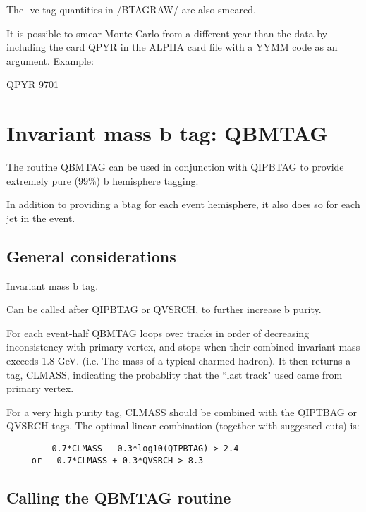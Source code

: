            The -ve tag quantities in /BTAGRAW/ are also smeared.

It is possible to smear Monte Carlo from a different year than the
data by including the card    QPYR in the ALPHA card file with a YYMM  
code as an argument.  Example:

QPYR 9701




\par
\section{\label{sec-BMTAG}Invariant mass b tag: QBMTAG}


       The routine QBMTAG can be used in conjunction with QIPBTAG
       to provide extremely pure (99\%) b hemisphere tagging.

      In addition to providing  a btag for each event
       hemisphere, it  also does so for each jet in the event.

\par
\subsection{\label{sec-QIPBMA}General considerations}
\par

    Invariant mass b tag.

     Can be called after QIPBTAG or QVSRCH, to further increase b purity.

     For each event-half QBMTAG loops over tracks in order of decreasing
     inconsistency with primary vertex, and stops when their combined
     invariant mass exceeds 1.8 GeV. (i.e. The mass of a typical charmed
     hadron). It then returns a tag, CLMASS, indicating the probablity
     that the ``last track" used came from primary vertex.

     For a very high purity tag, CLMASS should be combined with the
     QIPTBAG or QVSRCH tags. The optimal linear combination (together
     with suggested cuts) is:
\begin{verbatim} 
         0.7*CLMASS - 0.3*log10(QIPBTAG) > 2.4
     or   0.7*CLMASS + 0.3*QVSRCH > 8.3
\end{verbatim}  

\par
\subsection{\label{sec-QIPBMC}Calling the QBMTAG routine}
  

